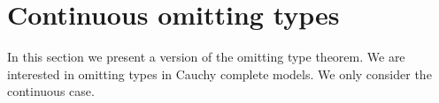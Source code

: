 \documentclass{amsproc}
\begin{document}
{\begin{comment}
  Let $a\models\{\gamma_i(z):i<\omega\}$.
  We claim that that $A,a$ does not p/c-isolate $p(x)$.
  Otherwise, by Fact~\ref{fact_isolation}, $\neg\xi_i(x,a)\rightarrow p(x)$ for some consistent $\neg\xi_i(x,a)$.
  This contradicts $a\models\gamma_{i+1}(z)$.
  
  Therefore the proof is complete if we can show that it is always possible to find the formula $\varphi(x)$ required in (2).
  
  Suppose for a contradiction that $\neg\xi_i(x,z)\wedge\gamma_i(z)$ is consistent while (\#) is inconsistent for all formulas $\varphi(x)\in p$.
  This immediately implies that 
  
  \ceq{\hfill\exists z\;\big[\neg\xi_i(x,z)\wedge\neg\tilde{\gamma}(z)\big]}{\rightarrow}{p(x).}
  
  By Fact~\ref{fact_isolation}, $p(x)$ is p/c-isolated, a contradiction.
\end{proof}

From the lemma we easily obtain an omitting types theorem for positive types that is very close to the classical one.

\begin{theorem}[Positive Omitting Types]\label{thm_pOTT}
  Let ${\EuScript L}^{\rm p}$ be separable.
  Let $A$ be countable.
  Assume also that $p(x)\subseteq{\EuScript L}^{\rm p}(A)$ is not p-isolated.
  Then there is a p-model $M$ containing $A$ that omits $p(x)$. 
\end{theorem}

\begin{proof}
  As in the classical proof, appy the lemma above and the Tarski-Vaught test (Theorem~\ref{thm_Tarski_Vaught}) to obtain a countable p-model $M$ that does not isolate $p(x)$.
  For p-models, p-isolating a type is equivalent to  realizing it.
\end{proof}
\end{comment}

\section{Continuous omitting types}

\def\ceq#1#2#3{\parbox[t]{25ex}{$\displaystyle #1$}\parbox{6ex}{\hfil $#2$}{$\displaystyle #3$}}

In this section we present a version of the omitting type theorem.
We are interested in omitting types in Cauchy complete models.
We only consider the continuous case.

}
\end{document}
